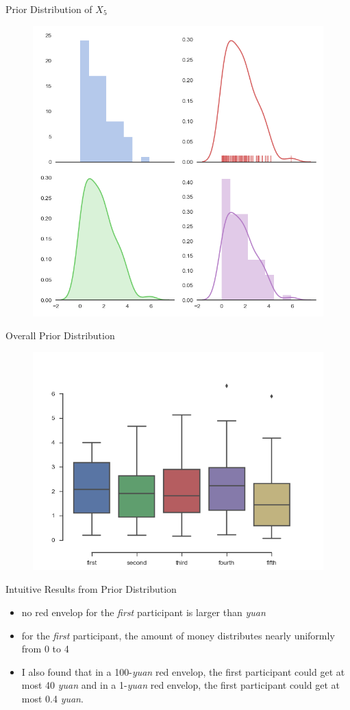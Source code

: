 \documentclass[12pt]{beamer}
\begin{document}
\begin{frame}{Prior Distribution of \(X_5\)}
	\begin{figure}[!ht]
		\centering
		\includegraphics[width=0.5\columnwidth,height=0.5\linewidth]{fig/10_5.png}
	\end{figure}
\end{frame}	

\begin{frame}{Overall Prior Distribution}
	\begin{figure}[!ht]
		\centering
		\includegraphics[width=0.5\columnwidth,height=0.5\linewidth]{fig/10_Overall.png}
	\end{figure}
\end{frame}

\begin{frame}{Intuitive Results from Prior Distribution}
	\begin{itemize}
		\item no red envelop for the \emph{first} participant is larger than \emph{yuan}
		\item for the \emph{first} participant, the amount of money distributes nearly uniformly from 0 to 4
		\item I also found that in a 100-\emph{yuan} red envelop, the first participant could get at most 40 \emph{yuan} and in a 1-\emph{yuan} red envelop, the first participant could get at most 0.4 \emph{yuan}.
	\end{itemize}
\end{frame}
\end{document}
